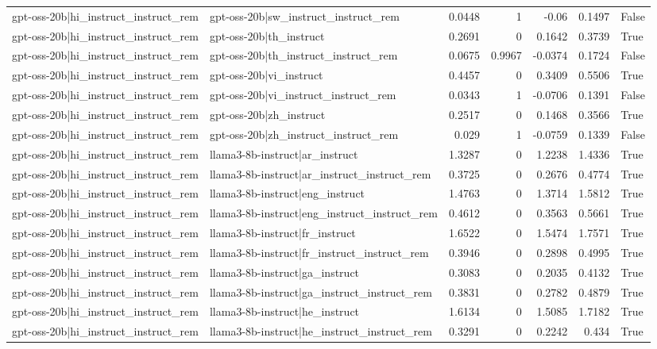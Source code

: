 \begin{table}
\begin{tabular}{l l r r r r l}
gpt-oss-20b|hi_instruct_instruct_rem & gpt-oss-20b|sw_instruct_instruct_rem & 0.0448 & 1 & -0.06 & 0.1497 & False \\
gpt-oss-20b|hi_instruct_instruct_rem & gpt-oss-20b|th_instruct & 0.2691 & 0 & 0.1642 & 0.3739 & True \\
gpt-oss-20b|hi_instruct_instruct_rem & gpt-oss-20b|th_instruct_instruct_rem & 0.0675 & 0.9967 & -0.0374 & 0.1724 & False \\
gpt-oss-20b|hi_instruct_instruct_rem & gpt-oss-20b|vi_instruct & 0.4457 & 0 & 0.3409 & 0.5506 & True \\
gpt-oss-20b|hi_instruct_instruct_rem & gpt-oss-20b|vi_instruct_instruct_rem & 0.0343 & 1 & -0.0706 & 0.1391 & False \\
gpt-oss-20b|hi_instruct_instruct_rem & gpt-oss-20b|zh_instruct & 0.2517 & 0 & 0.1468 & 0.3566 & True \\
gpt-oss-20b|hi_instruct_instruct_rem & gpt-oss-20b|zh_instruct_instruct_rem & 0.029 & 1 & -0.0759 & 0.1339 & False \\
gpt-oss-20b|hi_instruct_instruct_rem & llama3-8b-instruct|ar_instruct & 1.3287 & 0 & 1.2238 & 1.4336 & True \\
gpt-oss-20b|hi_instruct_instruct_rem & llama3-8b-instruct|ar_instruct_instruct_rem & 0.3725 & 0 & 0.2676 & 0.4774 & True \\
gpt-oss-20b|hi_instruct_instruct_rem & llama3-8b-instruct|eng_instruct & 1.4763 & 0 & 1.3714 & 1.5812 & True \\
gpt-oss-20b|hi_instruct_instruct_rem & llama3-8b-instruct|eng_instruct_instruct_rem & 0.4612 & 0 & 0.3563 & 0.5661 & True \\
gpt-oss-20b|hi_instruct_instruct_rem & llama3-8b-instruct|fr_instruct & 1.6522 & 0 & 1.5474 & 1.7571 & True \\
gpt-oss-20b|hi_instruct_instruct_rem & llama3-8b-instruct|fr_instruct_instruct_rem & 0.3946 & 0 & 0.2898 & 0.4995 & True \\
gpt-oss-20b|hi_instruct_instruct_rem & llama3-8b-instruct|ga_instruct & 0.3083 & 0 & 0.2035 & 0.4132 & True \\
gpt-oss-20b|hi_instruct_instruct_rem & llama3-8b-instruct|ga_instruct_instruct_rem & 0.3831 & 0 & 0.2782 & 0.4879 & True \\
gpt-oss-20b|hi_instruct_instruct_rem & llama3-8b-instruct|he_instruct & 1.6134 & 0 & 1.5085 & 1.7182 & True \\
gpt-oss-20b|hi_instruct_instruct_rem & llama3-8b-instruct|he_instruct_instruct_rem & 0.3291 & 0 & 0.2242 & 0.434 & True \\

\end{tabular}
\end{table}
